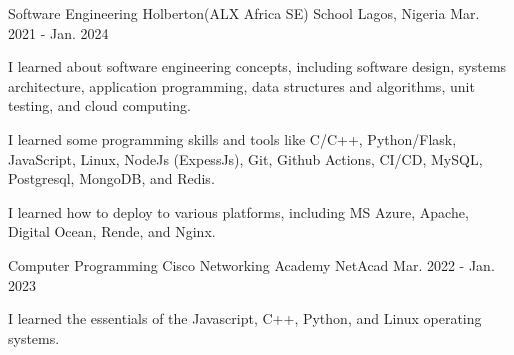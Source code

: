 

\begin{cventries}

  \cventry
    {Software Engineering} %
    {Holberton(ALX Africa SE) School} %
    {Lagos, Nigeria} %
    {Mar. 2021 - Jan. 2024} %
    {
      \begin{cvitems} %
        \item {I learned about software engineering concepts, including software design, systems architecture, application programming, data structures and algorithms, unit testing, and cloud computing.}
        \item {I learned some programming skills and tools like C/C++, Python/Flask, JavaScript, Linux, NodeJs (ExpessJs), Git, Github Actions, CI/CD, MySQL, Postgresql, MongoDB, and Redis.}
        \item {I learned how to deploy to various platforms, including MS Azure, Apache, Digital Ocean, Rende, and Nginx.}
      \end{cvitems}
    }

  \cventry
    {Computer Programming} %
    {Cisco Networking Academy} %
    {NetAcad} %
    {Mar. 2022 - Jan. 2023} %
    {
      \begin{cvitems} %
        \item {I learned the essentials of the Javascript, C++, Python, and Linux operating systems.}
      \end{cvitems}
    }

\end{cventries}
